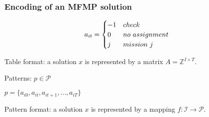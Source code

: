 \begin{frame}
\frametitle{\textbf{Encoding of an MFMP solution}}

  \begin{align}
   a_{it} = 
    \begin{cases} 
     -1 & check \\
     0 & no\,\,assignment \\
     j & mission\,\, j \\
    \end{cases}\notag
  \end{align}

  Table format: a solution \(x\) is represented by a matrix
  \(A = \mathbb{Z}^{I \times T}\).

  Patterns: \(p \in \mathcal{P}\)

  \(p = \{a_{i0}, a_{it}, a_{it+1}, ..., a_{iT}\}\)

  Pattern format: a solution \(x\) is represented by a mapping
  \(f: \mathcal{I} \to \mathcal{P}\).
\end{frame}
